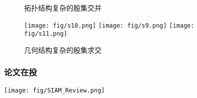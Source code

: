\documentclass[UTF8]{ctexbeamer}	%
\theoremstyle{plain}
\theoremstyle{definition}
\theoremstyle{remark}
\numberwithin{equation}{section}
\begin{document}
\begin{frame}
    \begin{figure}[!htb]
        \centering
         \qquad
        \vspace{-0.05in}
        \caption{拓扑结构复杂的殷集交并}
        \vspace{-0.1in}
    \end{figure}
    \begin{figure}[!htb]
        \centering
        \subfigure
        {\texttt{[image: fig/s10.png]}} \quad
        \subfigure
        {\texttt{[image: fig/s9.png]}} \quad
        \subfigure
        {\texttt{[image: fig/s11.png]}}
        \vspace{-0.05in}
        \caption{几何结构复杂的殷集求交}
    \end{figure}
\end{frame}

\begin{frame}
    \frametitle{论文在投}
    \centering
    \texttt{[image: fig/SIAM\_Review.png]}
\end{frame}
\end{document}

